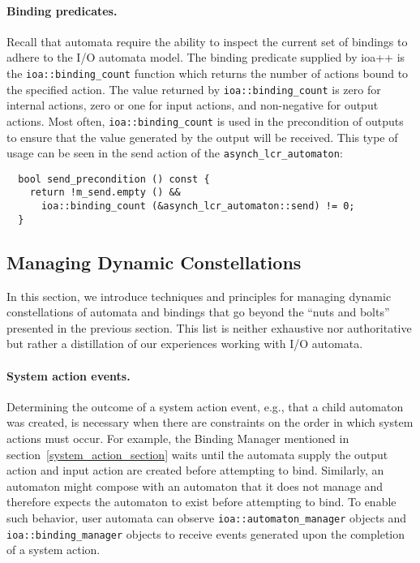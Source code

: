 \paragraph{Binding predicates.}
Recall that automata require the ability to inspect the current set of bindings to adhere to the I/O automata model.
The binding predicate supplied by ioa++ is the \verb+ioa::binding_count+ function which returns the number of actions bound to the specified action.
The value returned by \verb+ioa::binding_count+ is zero for internal actions, zero or one for input actions, and non-negative for output actions.
Most often, \verb+ioa::binding_count+ is used in the precondition of outputs to ensure that the value generated by the output will be received.
This type of usage can be seen in the send action of the \verb+asynch_lcr_automaton+:
\begin{lstlisting}
  bool send_precondition () const {
    return !m_send.empty () &&
      ioa::binding_count (&asynch_lcr_automaton::send) != 0;
  }
\end{lstlisting}

\subsection{Managing Dynamic Constellations}

In this section, we introduce techniques and principles for managing dynamic constellations of automata and bindings that go beyond the ``nuts and bolts'' presented in the previous section.
This list is neither exhaustive nor authoritative but rather a distillation of our experiences working with I/O automata.

\paragraph{System action events.}
Determining the outcome of a system action event, e.g., that a child automaton was created, is necessary when there are constraints on the order in which system actions must occur.
For example, the Binding Manager mentioned in section~\ref{system_action_section} waits until the automata supply the output action and input action are created before attempting to bind.
Similarly, an automaton might compose with an automaton that it does not manage and therefore expects the automaton to exist before attempting to bind.
To enable such behavior, user automata can observe \verb+ioa::automaton_manager+ objects and \verb+ioa::binding_manager+ objects to receive events generated upon the completion of a system action.

